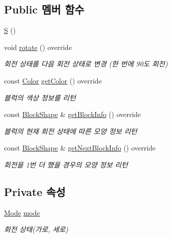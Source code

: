\subsection*{Public 멤버 함수}
\begin{DoxyCompactItemize}
\item 
\mbox{\hyperlink{class_s_a375a5fe3ea61076cbb372c47fcd6eecd}{S}} ()
\item 
void \mbox{\hyperlink{class_s_a9d968087a1d499416a0ce91cce3c8f9f}{rotate}} () override
\begin{DoxyCompactList}\small\item\em 회전 상태를 다음 회전 상태로 변경 (한 번에 90도 회전) \end{DoxyCompactList}\item 
const \mbox{\hyperlink{class_block_ad054b4ac51df79aa910040b2a2fdf7b5}{Color}} \mbox{\hyperlink{class_s_a6b0a59fa5ae754544d2ad1c250f8dece}{get\+Color}} () override
\begin{DoxyCompactList}\small\item\em 블럭의 색상 정보를 리턴 \end{DoxyCompactList}\item 
const \mbox{\hyperlink{class_block_aca5d951639f113e2ebd7856209d6b9ab}{Block\+Shape}} \& \mbox{\hyperlink{class_s_aedd52f4a59ed94415945a54e0a1a477b}{get\+Block\+Info}} () override
\begin{DoxyCompactList}\small\item\em 블럭의 현재 회전 상태에 따른 모양 정보 리턴 \end{DoxyCompactList}\item 
const \mbox{\hyperlink{class_block_aca5d951639f113e2ebd7856209d6b9ab}{Block\+Shape}} \& \mbox{\hyperlink{class_s_a48ef6d5f37afe48b14ea11fe00537c5e}{get\+Next\+Block\+Info}} () override
\begin{DoxyCompactList}\small\item\em 회전을 1번 더 했을 경우의 모양 정보 리턴 \end{DoxyCompactList}\end{DoxyCompactItemize}
\subsection*{Private 속성}
\begin{DoxyCompactItemize}
\item 
\mbox{\hyperlink{class_block_a33a96023993478ad4b52426188454765}{Mode}} \mbox{\hyperlink{class_s_a0a3c150f9afbfe65a5558d947b999776}{mode}}
\begin{DoxyCompactList}\small\item\em 회전 상태(가로, 세로) \end{DoxyCompactList}\end{DoxyCompactItemize}
